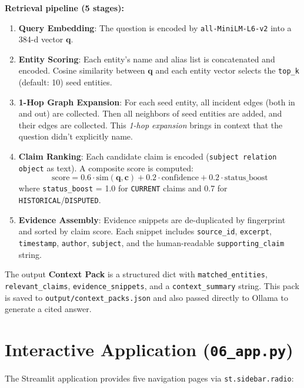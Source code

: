 \documentclass[12pt,a4paper]{article}
\begin{document}
\textbf{Retrieval pipeline (5 stages):}

\begin{enumerate}[label=\textbf{Stage \arabic*:}]
    \item \textbf{Query Embedding}: The question is encoded by \texttt{all-MiniLM-L6-v2} into a 384-d vector $\mathbf{q}$.
    \item \textbf{Entity Scoring}: Each entity's name and alias list is concatenated and encoded. Cosine similarity between $\mathbf{q}$ and each entity vector selects the \texttt{top\_k} (default: 10) seed entities.
    \item \textbf{1-Hop Graph Expansion}: For each seed entity, all incident edges (both in and out) are collected. Then all neighbors of seed entities are added, and their edges are collected. This \textit{1-hop expansion} brings in context that the question didn't explicitly name.
    \item \textbf{Claim Ranking}: Each candidate claim is encoded (\texttt{subject relation object} as text). A composite score is computed:
    $$\text{score} = 0.6 \cdot \text{sim}(\mathbf{q}, \mathbf{c}) + 0.2 \cdot \text{confidence} + 0.2 \cdot \text{status\_boost}$$
    where \texttt{status\_boost} = 1.0 for \texttt{CURRENT} claims and 0.7 for \texttt{HISTORICAL}/\texttt{DISPUTED}.
    \item \textbf{Evidence Assembly}: Evidence snippets are de-duplicated by fingerprint and sorted by claim score. Each snippet includes \texttt{source\_id}, \texttt{excerpt}, \texttt{timestamp}, \texttt{author}, \texttt{subject}, and the human-readable \texttt{supporting\_claim} string.
\end{enumerate}

The output \textbf{Context Pack} is a structured dict with \texttt{matched\_entities}, \texttt{relevant\_claims}, \texttt{evidence\_snippets}, and a \texttt{context\_summary} string. This pack is saved to \texttt{output/context\_packs.json} and also passed directly to Ollama to generate a cited answer.

\section{Interactive Application (\texttt{06\_app.py})}

The Streamlit application provides five navigation pages via \texttt{st.sidebar.radio}:
\end{document}
